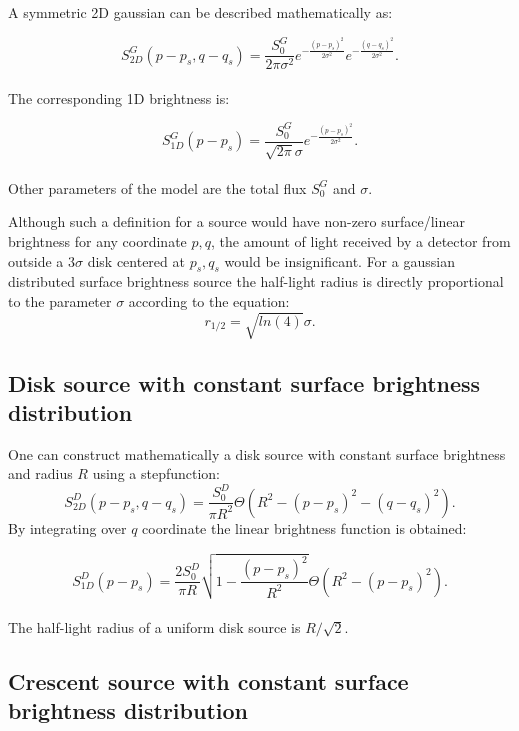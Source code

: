 A symmetric 2D gaussian can be described mathematically as:

\begin{equation}
 S_{2D}^G(p-p_s, q-q_s) = \frac{S_0^G}{2 \pi \sigma^2} e^{-\frac{(p-p_s)^2}{2 \sigma^2}} e^{-\frac{(q-q_s)^2}{2 \sigma^2}}.
\end{equation}
\\
The corresponding 1D brightness is:

\begin{equation}
 S_{1D}^G(p-p_s) = \frac{S_0^G}{\sqrt{2 \pi} \sigma} e^{-\frac{(p-p_s)^2}{2 \sigma^2}}.
\end{equation}
\\
Other parameters of the model are the total flux $S_0^G$ and $\sigma$. 

Although such a definition for a source would have non-zero surface/linear brightness for any coordinate $p,q$, the amount of light received by a detector from outside a $3 \sigma$ disk centered at $p_s, q_s$ 
would be insignificant. For a gaussian distributed surface brightness source the half-light radius is directly proportional to the parameter $\sigma$ according to the equation:
\begin{equation}
r_{1/2} = \sqrt{ln(4)} \sigma.
\end{equation}

\subsection{Disk source with constant surface brightness distribution}

One can construct mathematically a disk source with constant surface brightness and radius $R$ using a stepfunction:
\begin{equation}
 S_{2D}^D(p-p_s, q-q_s) = \frac{S_0^D}{\pi R^2} \Theta \left( R^2 - \left( p-p_s \right)^2 - \left( q-q_s \right)^2 \right).
\end{equation}
By integrating over $q$ coordinate the linear brightness function is obtained:


\begin{equation}
 S_{1D}^D(p-p_s) = \frac{2 S_0^D}{\pi R}  \sqrt{1 - \frac{(p-p_s)^2}{R^2} }    \Theta \left( R^2 - \left( p-p_s \right)^2 \right).
\end{equation}
\\
The half-light radius of a uniform disk source is $R/\sqrt{2}$.

\subsection{Crescent source with constant surface brightness distribution}\label{subsec:crescent}

